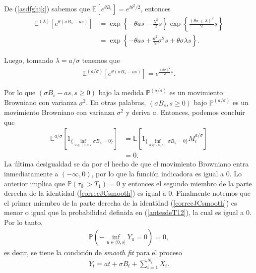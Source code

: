 De (\ref{asdfghjk}) sabemos que $\mathbb{E} \left[ e^{ \theta B_t } \right] = e^{t\theta^2 / 2}$, entonces
\begin{align*}
	\mathbb{E}^{(\lambda)} \left[ e^{\theta (\sigma B_s - as)} \right] & = \exp \left\{ - \theta a s - \frac{\lambda^2}{2} s \right\} \exp \left\{ \frac{(\theta \sigma +  \lambda)^2}{2} s \right\} \\
    & = \exp \left\{ - \theta a s + \frac{ \theta^2 }{2} \sigma^2 s + \theta \sigma \lambda s \right\}.
\end{align*}

Luego, tomando $\lambda = a/\sigma$ tenemos que
\begin{align*}
	\mathbb{E}^{(a/\sigma)} \left[ e^{\theta (\sigma B_s - as)} \right] = e^{ \frac{ (\theta \sigma)^2 }{2} s}.
\end{align*}

Por lo que $(\sigma B_s - as, s \geq 0)$ bajo la medida $\mathbb{P}^{(a/\sigma)}$ es un movimiento Browniano con varianza $\sigma^2$. En otras palabras, $(\sigma B_s, s \geq 0)$ bajo $\mathbb{P}^{(a/\sigma)}$ es un movimiento Browniano con varianza $\sigma^2$ y deriva $a$. Entonces, podemos concluir que 
\begin{align*}
	\mathbb{E}^{a/\sigma} \left[ 1_{ \{ \inf_{u \in (0, s)} \sigma B_u = 0 \}} \right] & = \mathbb{E} \left[ 1_{\{ \inf_{u \in (0, s)} \sigma B_u = 0 \}} M_t^{a/\sigma} \right] \\
    & = 0.
\end{align*}
La última desigualdad se da por el hecho de que el movimiento Browniano entra inmediatamente a $(- \infty, 0)$, por lo que la función indicadora es igual a $0$. Lo anterior implica que $\mathbb{P}(\tau_0^{-} > T_1) = 0$ y entonces el segundo miembro de la parte derecha de la identidad (\ref{correcJCsmooth}) es igual a $0$. Finalmente notemos que el primer miembro de la parte derecha de la identidad (\ref{correcJCsmooth}) es menor o igual que la probabilidad definida en (\ref{antesdeT12}), la cual es igual a $0$. Por lo tanto, 
\begin{align*}
	\mathbb{P} \left(-\inf_{u \in (0, s]} Y_u = 0\right) = 0, 
\end{align*}
es decir, se tiene la condición de \textit{smooth fit} para el proceso 
\begin{align*}
	Y_t = at + \sigma B_t + \sum_{i=1}^{N_t} X_i.
\end{align*}
